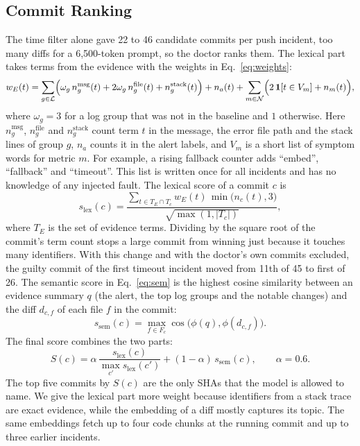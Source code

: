 \documentclass[12pt,onecolumn,draftclsnofoot]{IEEEtran}
\begin{document}
\subsection{Commit Ranking}
The time filter alone gave 22 to 46 candidate commits per push incident, too many diffs for a 6,500-token prompt, so the doctor ranks them. The lexical part takes terms from the evidence with the weights in Eq.~\eqref{eq:weights}:
\begin{equation}
w_E(t)=\sum_{g\in\mathcal{L}}\Bigl(\omega_g\,n^{\mathrm{msg}}_g(t)+2\omega_g\,n^{\mathrm{file}}_g(t)+n^{\mathrm{stack}}_g(t)\Bigr)+n_a(t)+\sum_{m\in\mathcal{N}}\Bigl(2\,\mathbf{1}[t\in V_m]+n_m(t)\Bigr),
\label{eq:weights}
\end{equation}
where $\omega_g=3$ for a log group that was not in the baseline and $1$ otherwise. Here $n^{\mathrm{msg}}_g$, $n^{\mathrm{file}}_g$ and $n^{\mathrm{stack}}_g$ count term $t$ in the message, the error file path and the stack lines of group $g$, $n_a$ counts it in the alert labels, and $V_m$ is a short list of symptom words for metric $m$. For example, a rising fallback counter adds ``embed'', ``fallback'' and ``timeout''. This list is written once for all incidents and has no knowledge of any injected fault. The lexical score of a commit $c$ is
\begin{equation}
s_{\mathrm{lex}}(c)=\frac{\sum_{t\in T_E\cap T_c} w_E(t)\,\min\bigl(n_c(t),3\bigr)}{\sqrt{\max(1,|T_c|)}},
\label{eq:lex}
\end{equation}
where $T_E$ is the set of evidence terms. Dividing by the square root of the commit's term count stops a large commit from winning just because it touches many identifiers. With this change and with the doctor's own commits excluded, the guilty commit of the first timeout incident moved from 11th of 45 to first of 26. The semantic score in Eq.~\eqref{eq:sem} is the highest cosine similarity between an evidence summary $q$ (the alert, the top log groups and the notable changes) and the diff $d_{c,f}$ of each file $f$ in the commit:
\begin{equation}
s_{\mathrm{sem}}(c)=\max_{f\in F_c}\cos\bigl(\phi(q),\phi(d_{c,f})\bigr).
\label{eq:sem}
\end{equation}
The final score combines the two parts:
\begin{equation}
S(c)=\alpha\,\frac{s_{\mathrm{lex}}(c)}{\max_{c'}s_{\mathrm{lex}}(c')}+(1-\alpha)\,s_{\mathrm{sem}}(c),\qquad \alpha=0.6.
\label{eq:score}
\end{equation}
The top five commits by $S(c)$ are the only SHAs that the model is allowed to name. We give the lexical part more weight because identifiers from a stack trace are exact evidence, while the embedding of a diff mostly captures its topic. The same embeddings fetch up to four code chunks at the running commit and up to three earlier incidents.
\end{document}
